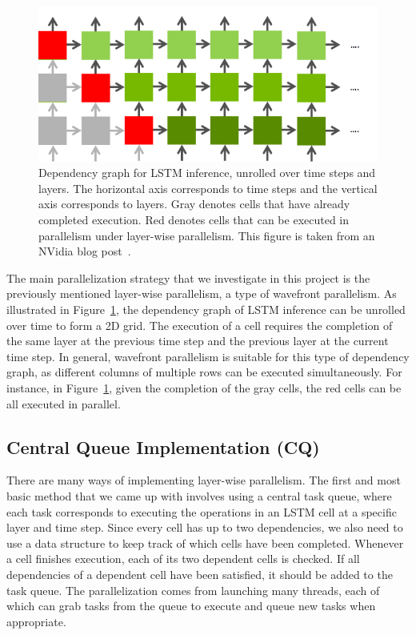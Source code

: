 \documentclass[12pt]{article}
\begin{document}
\begin{figure}
    \centering
    \includegraphics[width=12cm]{wavefront_parallelism.png}
    \caption{Dependency graph for LSTM inference, unrolled over time steps and layers. The horizontal axis corresponds to time steps and the vertical axis corresponds to layers. Gray denotes cells that have already completed execution. Red denotes cells that can be executed in parallelism under layer-wise parallelism. This figure is taken from an NVidia blog post~\cite{nvidia_lstm}.}
    \label{fig:wavefront_parallelism}
\end{figure}

The main parallelization strategy that we investigate in this project is the previously mentioned layer-wise parallelism, a type of wavefront parallelism.
As illustrated in Figure~\ref{fig:wavefront_parallelism}, the dependency graph of LSTM inference can be unrolled over time to form a 2D grid. The execution of a cell requires the completion of the same layer at the previous time step and the previous layer at the current time step.
In general, wavefront parallelism is suitable for this type of dependency graph, as different columns of multiple rows can be executed simultaneously. For instance, in Figure~\ref{fig:wavefront_parallelism}, given the completion of the gray cells, the red cells can be all executed in parallel.

\subsection{Central Queue Implementation (CQ)}
There are many ways of implementing layer-wise parallelism.
The first and most basic method that we came up with involves using a central task queue, where each task corresponds to executing the operations in an LSTM cell at a specific layer and time step.
Since every cell has up to two dependencies, we also need to use a data structure to keep track of which cells have been completed.
Whenever a cell finishes execution, each of its two dependent cells is checked. If all dependencies of a dependent cell have been satisfied, it should be added to the task queue.
The parallelization comes from launching many threads, each of which can grab tasks from the queue to execute and queue new tasks when appropriate.
\end{document}
